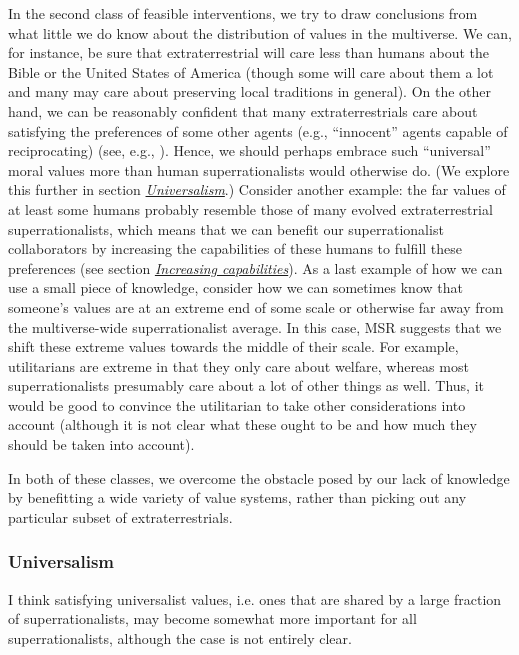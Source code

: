 In the second class of feasible interventions, we try to draw
conclusions from what little we do know about the distribution of values
in the multiverse. We can, for instance, be sure that extraterrestrial
will care less than humans about the Bible or the United States of
America (though some will care about them a lot and many may care about
preserving local traditions in general). On the other hand, we can be
reasonably confident that many extraterrestrials care about satisfying
the preferences of some other agents (e.g., ``innocent'' agents capable
of reciprocating) (see, e.g.,
\parencite{Axelrod2006-ci,Trivers1971-rb,Fehr1999-pd,Dawkins1976-cd,Taylor1987-wn,Buss2015-kp}).
Hence, we should perhaps embrace such ``universal'' moral values more
than human superrationalists would otherwise do. (We explore this
further in section
\protect\hyperlink{universalism}{\emph{Universalism}}.) Consider
another example: the far values of at least some humans probably
resemble those of many evolved extraterrestrial superrationalists, which
means that we can benefit our superrationalist collaborators by
increasing the capabilities of these humans to fulfill these preferences
(see section
\protect\hyperlink{increasing-capabilities}{\emph{Increasing
capabilities}}). As a last example of how we can use a small piece of
knowledge, consider how we can sometimes know that someone's values are
at an extreme end of some scale or otherwise far away from the
multiverse-wide superrationalist average. In this case, MSR suggests
that we shift these extreme values towards the middle of their scale.
For example, utilitarians are extreme in that they only care about
welfare, whereas most superrationalists presumably care about a lot of
other things as well. Thus, it would be good to convince the utilitarian
to take other considerations into account (although it is not clear what
these ought to be and how much they should be taken into account).

In both of these classes, we overcome the obstacle posed by our lack of
knowledge by benefitting a wide variety of value systems, rather than
picking out any particular subset of extraterrestrials.

\hypertarget{universalism}{\subsubsection{Universalism}\label{universalism}}

I think satisfying universalist values, i.e. ones that are shared by a
large fraction of superrationalists, may become somewhat more important
for all superrationalists, although the case is not entirely clear.

